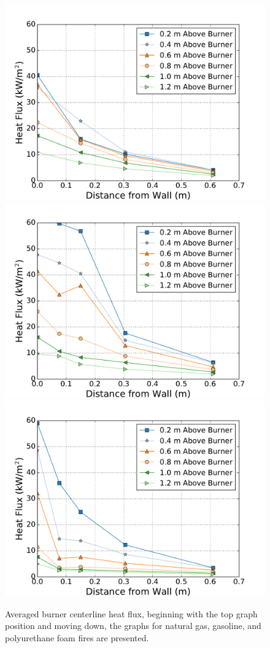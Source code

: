 \documentclass[twoside]{uocthesis}
\begin{document}
{ \begin{figure}[p]
	\centering
	\includegraphics[width=.625\columnwidth]{../Figures/IWGB_NG_HF_Center_Avg}\\
	\includegraphics[width=.625\columnwidth]{../Figures/IWGB_GAS_HF_Center_Avg}\\
	\includegraphics[width=.625\columnwidth]{../Figures/IWGB_PUF_HF_Center_Avg}\\
	\caption[Averaged burner centerline heat flux for the natural gas, gasoline, and foam fires]{Averaged burner centerline heat flux, beginning with the top graph position and moving down, the graphs for natural gas, gasoline, and polyurethane foam fires are presented.}
	\label{IWGB_HF_Comp_Center}
\end{figure}

}
\end{document}
